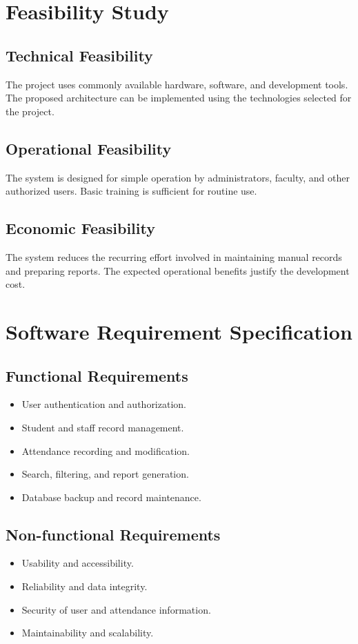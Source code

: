\documentclass[12pt,a4paper]{report}
\begin{document}
\section{Feasibility Study}
\subsection{Technical Feasibility}
The project uses commonly available hardware, software, and development tools. The proposed architecture can be implemented using the technologies selected for the project.

\subsection{Operational Feasibility}
The system is designed for simple operation by administrators, faculty, and other authorized users. Basic training is sufficient for routine use.

\subsection{Economic Feasibility}
The system reduces the recurring effort involved in maintaining manual records and preparing reports. The expected operational benefits justify the development cost.

\section{Software Requirement Specification}
\subsection{Functional Requirements}
\begin{itemize}
  \item User authentication and authorization.
  \item Student and staff record management.
  \item Attendance recording and modification.
  \item Search, filtering, and report generation.
  \item Database backup and record maintenance.
\end{itemize}

\subsection{Non-functional Requirements}
\begin{itemize}
  \item Usability and accessibility.
  \item Reliability and data integrity.
  \item Security of user and attendance information.
  \item Maintainability and scalability.
\end{itemize}
\end{document}
